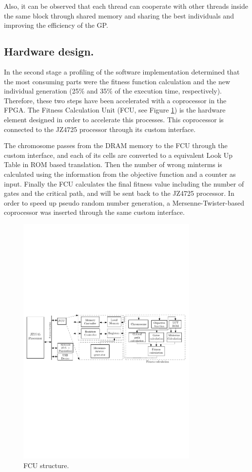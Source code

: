 \documentclass[runningheads,a4paper]{llncs}
\begin{document}
Also, it can be observed that each thread can cooperate with other threads inside the same block through shared memory and sharing the best individuals and improving the efficiency of the GP.




\subsection{Hardware design.}
In the second stage a profiling of the software implementation determined that the most consuming parts were the fitness function calculation and the new individual generation (25\% and 35\% of the execution time, respectively). Therefore, these two steps have been accelerated with a coprocessor in the FPGA. The Fitness Calculation Unit (FCU, see Figure \ref{fig:hw_block}) is the hardware element designed in order to accelerate this processes. This coprocessor is connected to the JZ4725 processor through its custom interface.                                                              

The chromosome passes from the DRAM memory to the FCU through the custom interface, and each of its cells are converted to a equivalent Look Up Table in ROM based translation. Then the number of wrong minterms is calculated using the information from the objective function and a counter as input. Finally the FCU calculates the final fitness value including the number of gates and the critical path, and will be sent back to the JZ4725 processor. In order to speed up pseudo random number generation, a Mersenne-Twister-based coprocessor was inserted through the same custom interface. 

\begin{figure}[htpb]
\begin{center} 
\includegraphics[width=9cm]{./images/hw_block_diagram} \end{center}
\caption{FCU structure.}\label{fig:hw_block}
\end{figure}
\end{document}
